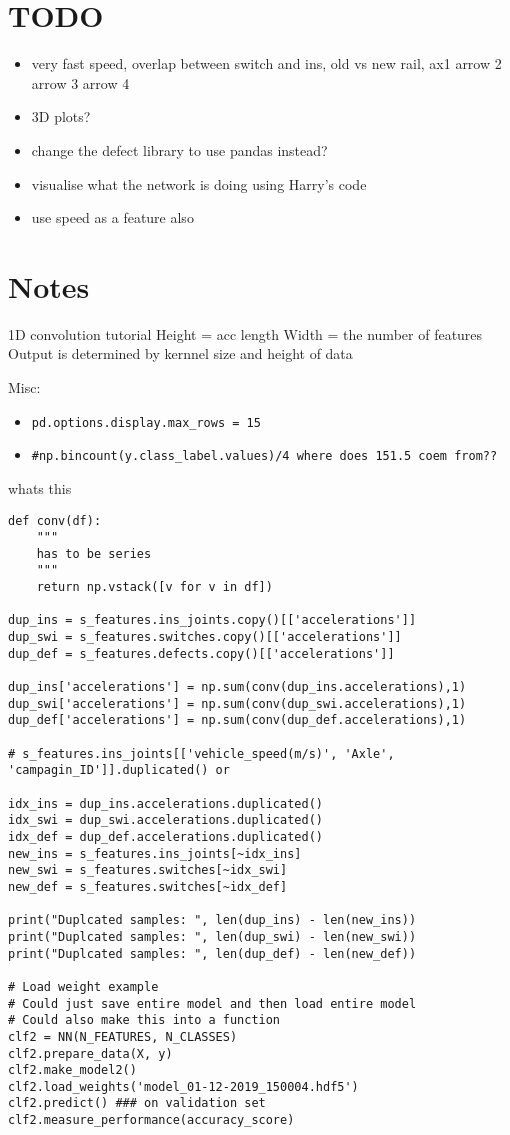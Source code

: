 \newpage
\section{TODO}
\begin{itemize}
	\item very fast speed, overlap between switch and ins, old vs new rail, ax1 arrow 2 arrow 3 arrow 4
	\item 3D plots?
	\item change the defect library to use pandas instead?
	\item visualise what the network is doing using Harry's code
	\item use speed as a feature also
\end{itemize}


\newpage
\section{Notes}
1D convolution tutorial
Height = acc length
Width = the number of features
Output is determined by kernnel size and height of data

Misc:
\begin{itemize}
	\item \verb|pd.options.display.max_rows = 15|
	\item \verb|#np.bincount(y.class_label.values)/4 where does 151.5 coem from??|
\end{itemize}

whats this
\begin{verbatim}
def conv(df):
    """
    has to be series
    """
    return np.vstack([v for v in df])

dup_ins = s_features.ins_joints.copy()[['accelerations']]
dup_swi = s_features.switches.copy()[['accelerations']]
dup_def = s_features.defects.copy()[['accelerations']]

dup_ins['accelerations'] = np.sum(conv(dup_ins.accelerations),1)
dup_swi['accelerations'] = np.sum(conv(dup_swi.accelerations),1)
dup_def['accelerations'] = np.sum(conv(dup_def.accelerations),1)

# s_features.ins_joints[['vehicle_speed(m/s)', 'Axle', 'campagin_ID']].duplicated() or

idx_ins = dup_ins.accelerations.duplicated()
idx_swi = dup_swi.accelerations.duplicated()
idx_def = dup_def.accelerations.duplicated()
new_ins = s_features.ins_joints[~idx_ins]
new_swi = s_features.switches[~idx_swi]
new_def = s_features.switches[~idx_def]

print("Duplcated samples: ", len(dup_ins) - len(new_ins))
print("Duplcated samples: ", len(dup_swi) - len(new_swi))
print("Duplcated samples: ", len(dup_def) - len(new_def))

# Load weight example 
# Could just save entire model and then load entire model
# Could also make this into a function
clf2 = NN(N_FEATURES, N_CLASSES)
clf2.prepare_data(X, y)
clf2.make_model2()
clf2.load_weights('model_01-12-2019_150004.hdf5')
clf2.predict() ### on validation set
clf2.measure_performance(accuracy_score)
\end{verbatim}

